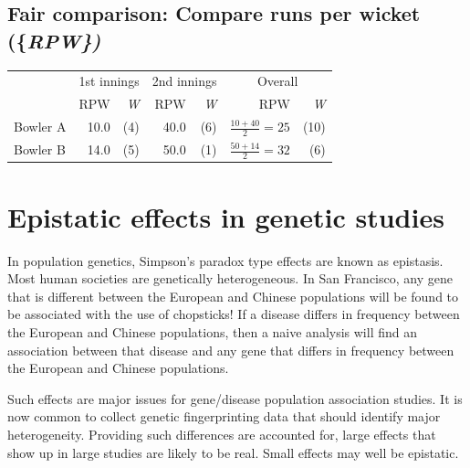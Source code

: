 \documentclass[
  10pt,
  b5paper]{book}
\begin{document}
\hypertarget{fair-comparison-compare-runs-per-wicket}{%
\subsection*{\texorpdfstring{Fair comparison: Compare runs per wicket (\{\em RPW\})}{Fair comparison: Compare runs per wicket (\{\})}}\label{fair-comparison-compare-runs-per-wicket}}

\vspace*{-5pt}

\begin{center}
\begin{tabular}{lrr||rr||rr}
\hline
 & \multicolumn{2}{c}{1st innings} & \multicolumn{2}{c}{2nd innings} &
\multicolumn{2}{c}{Overall} \\
\cline{2-3} \cline{4-5} \cline{6-7}
         &  RPW & {\em W}   &  RPW & {\em W} &
           RPW & {\em W} \\[4pt]
Bowler A &  10.0 & (4) & 40.0 & (6)  &
$\frac{10+40}{2} = 25$ & (10)\\[4pt]
Bowler B & 14.0 & (5)  & 50.0 & (1) & $\frac{50+14}{2} = 32$  &  (6)\\[4pt]
\cline{2-3} \cline{4-5} \cline{6-7}
\end{tabular}
\end{center}

\hypertarget{epistatic-effects-in-genetic-studies}{%
\section{Epistatic effects in genetic studies}\label{epistatic-effects-in-genetic-studies}}

In population genetics, Simpson's paradox type effects are known as epistasis. Most human societies are genetically heterogeneous. In San Francisco, any gene that is different between the European and Chinese populations will be found to be associated with the use of chopsticks! If a disease differs in frequency between the European and Chinese populations, then a naive analysis will find an association between that disease and any gene that differs in frequency between the European and Chinese populations.

Such effects are major issues for gene/disease population association studies. It is now common to collect genetic fingerprinting data that should identify major heterogeneity. Providing such differences are accounted for, large effects that show up in large studies are likely to be real. Small effects may well be epistatic.
\end{document}
